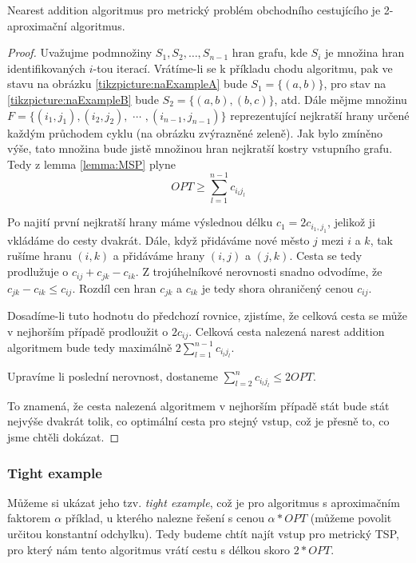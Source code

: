 \documentclass[
  biblatex,
  figures=false,
  glossaries,
  index
]{kidiplom}
\begin{document}
\begin{theorem}
Nearest addition algoritmus pro metrický problém obchodního cestujícího je 2-aproximační algoritmus.
\end{theorem}

\begin{proof}
Uvažujme podmnožiny $S_1, S_2,…,S_{n-1}$ hran grafu, kde $S_i$ je množina hran identifikovaných $i$-tou iterací. Vrátíme-li se k příkladu chodu algoritmu, pak ve stavu na obrázku \ref{tikzpicture:naExampleA} bude $S_1 = \{(a, b)\}$, pro stav na \ref{tikzpicture:naExampleB} bude $S_2 = \{(a, b), (b, c)\}$, atd. Dále mějme množinu $F = \{(i_1, j_1), (i_2, j_2), $ $\cdots$ $,(i_{n-1}, j_{n-1})\}$ reprezentující nejkratší hrany určené každým průchodem cyklu (na obrázku zvýrazněné zeleně). Jak bylo zmíněno výše, tato množina bude jistě množinou hran nejkratší kostry vstupního grafu. Tedy z lemma \ref{lemma:MSP} plyne
$$
OPT \ge\sum_{l = 1}^{n-1} c_{i_l j_l}
$$

Po najití první nejkratší hrany máme výslednou délku $c_1 = 2c_{i_1, j_1}$, jelikož ji vkládáme do cesty dvakrát. Dále, když přidáváme nové město $j$ mezi $i$ a $k$, tak rušíme hranu $(i, k)$ a přidáváme hrany $(i, j)$ a $(j, k)$. Cesta se tedy prodlužuje o $c_{ij} + c_{jk} - c_{ik}$. Z trojúhelníkové nerovnosti snadno odvodíme, že $c_{jk} - c_{ik} \le c_{ij}$. Rozdíl cen hran $c_{jk}$ a $c_{ik}$ je tedy shora ohraničený cenou $c_{ij}$.

Dosadíme-li tuto hodnotu do předchozí rovnice, zjistíme, že celková cesta se může v nejhorším případě prodloužit o $2c_{ij}$. Celková cesta nalezená narest addition algoritmem bude tedy maximálně $2\sum_{l=1}^{n-1}c_{i_l j_l}$.

Upravíme li poslední nerovnost, dostaneme $\sum_{l=2}^{n}c_{i_l j_l} \le 2OPT$.

To znamená, že cesta nalezená algoritmem v nejhorším případě stát bude stát nejvýše dvakrát tolik, co optimální cesta pro stejný vstup, což je přesně to, co jsme chtěli dokázat.
\end{proof}

\subsubsection{Tight example} \label{tightExample:NA}

Můžeme si ukázat jeho tzv. \textit{tight example}, což je pro algoritmus s aproximačním faktorem $\alpha$ příklad, u kterého nalezne řešení s cenou $\alpha * OPT$ (můžeme povolit určitou konstantní odchylku). Tedy budeme chtít najít vstup  pro metrický TSP, pro který nám tento algoritmus vrátí cestu s délkou skoro $2 * OPT$.
\end{document}
